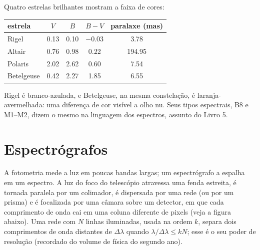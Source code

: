 Quatro estrelas brilhantes mostram a faixa de cores:
\begin{center}
\small
\begin{tabular}{lcccc}
\hline
estrela & $V$ & $B$ & $B - V$ & paralaxe (\unit{mas}) \\
\hline
Rigel & 0.13 & 0.10 & $-0.03$ & 3.78 \\
Altair & 0.76 & 0.98 & 0.22 & 194.95 \\
Polaris & 2.02 & 2.62 & 0.60 & 7.54 \\
Betelgeuse & 0.42 & 2.27 & 1.85 & 6.55 \\
\hline
\end{tabular}
\end{center}
Rigel é branco-azulada, e Betelgeuse, na mesma constelação, é laranja-avermelhada: uma diferença de cor visível a olho nu. Seus tipos espectrais, B8 e M1--M2, dizem o mesmo na linguagem dos espectros, assunto do Livro 5.

\section{Espectrógrafos}

A fotometria mede a luz em poucas bandas largas; um espectrógrafo a espalha em um espectro. A luz do foco do telescópio atravessa uma fenda estreita, é tornada paralela por um colimador, é dispersada por uma rede (ou por um prisma) e é focalizada por uma câmara sobre um detector, em que cada comprimento de onda cai em uma coluna diferente de pixels (veja a figura abaixo). Uma rede com $N$ linhas iluminadas, usada na ordem $k$, separa dois comprimentos de onda distantes de $\Delta\lambda$ quando $\lambda/\Delta\lambda \le kN$; esse é o seu poder de resolução (recordado do volume de física do segundo ano).

